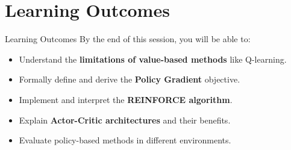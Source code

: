 \section{Learning Outcomes}
\begin{frame}{Learning Outcomes}
    \large
    By the end of this session, you will be able to:
    \vspace{0.5em}
    \begin{itemize}
        \setlength{\itemsep}{1em}
        \item Understand the \textbf{limitations of value-based methods} like Q-learning.
        \item Formally define and derive the \textbf{Policy Gradient} objective.
        \item Implement and interpret the \textbf{REINFORCE algorithm}.
        \item Explain \textbf{Actor-Critic architectures} and their benefits.
        \item Evaluate policy-based methods in different environments.
    \end{itemize}
\end{frame}